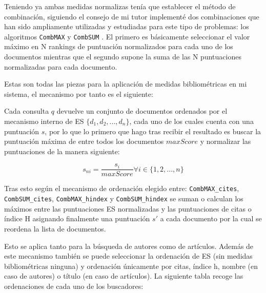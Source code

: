 Teniendo ya ambas medidas normalizas tenía que establecer el método de combinación, siguiendo el consejo de mi tutor implementé dos combinaciones que han sido ampliamente utilizadas y estudiadas para este tipo de problemas: los algoritmos \texttt{CombMAX} y \texttt{CombSUM} \cite{DBLP:conf/trec/ShawF94}. El primero es básicamente seleccionar el valor máximo en N rankings de puntuación normalizados para cada uno de los documentos mientras que el segundo supone la suma de las N puntuaciones normalizadas para cada documento. 

Estas son todas las piezas para la aplicación de medidas bibliométricas en mi sistema, el mecanismo por tanto es el siguiente:

Cada consulta $q$ devuelve un conjunto de documentos ordenados por el mecanismo interno de \acrshort{ES} $\{d_1, d_2, ..., d_n\}$, cada uno de los cuales cuenta con una puntuación $s$, por lo que lo primero que hago tras recibir el resultado es buscar la puntuación máxima de entre todos los documentos $maxScore$ y normalizar las puntuaciones de la manera siguiente:

\begin{equation}
s_{ni} = \frac{s_i}{maxScore} \forall i \in \{1, 2, ..., n\}
\end{equation}

Tras esto según el mecanismo de ordenación elegido entre: \texttt{CombMAX\_cites}, \texttt{CombSUM\_cites}, \texttt{CombMAX\_hindex} y \texttt{CombSUM\_hindex} se suman o calculan los máximos entre las puntuaciones \acrshort{ES} normalizadas y las puntuaciones de citas o índice H asignando finalmente una puntuación $s'$ a cada documento por la cual se reordena la lista de documentos.

Esto se aplica tanto para la búsqueda de autores como de artículos. Además de este mecanismo también se puede seleccionar la ordenación de \acrshort{ES} (sin medidas bibliométricas ninguna) y ordenación únicamente por citas, índice h, nombre (en caso de autores) o título (en caso de artículos). La siguiente tabla recoge las ordenaciones de cada uno de los buscadores:

